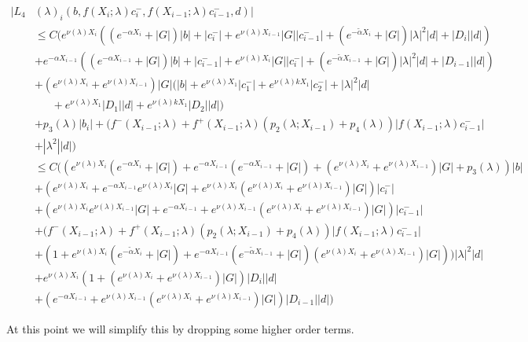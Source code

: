 \documentclass[12pt]{article}
\begin{document}
\begin{enumerate}
\begin{align*}
|L_4&(\lambda)_i(b, f(X_i; \lambda) c_i^-, f(X_{i-1}; \lambda) c_{i-1}^-, d)|\\ 
&\leq C\Big( e^{\nu(\lambda)X_{i}} ((e^{-\alpha X_i} + |G|) |b| 
+ |c_i^-| + e^{\nu(\lambda)X_{i-1}} |G||c_{i-1}^-| + (e^{-\tilde{\alpha} X_i} + |G|) |\lambda|^2 |d| + |D_i||d|)\\
&+  e^{-\alpha X_{i-1}} ((e^{-\alpha X_{i-1}} + |G|) |b| 
+ |c_{i-1}^-| + e^{\nu(\lambda)X_i} |G||c_i^-| + (e^{-\tilde{\alpha} X_{i-1}} + |G|) |\lambda|^2 |d| + |D_{i-1}||d|) \\
&+ (e^{\nu(\lambda)X_i} + e^{\nu(\lambda)X_{i-1}}) |G| ( |b| + e^{\nu(\lambda) X_1} |c_1^-| +  e^{\nu(\lambda) k X_1} |c_2^-| + |\lambda|^2 |d| \\
&\:\:\:\:\:\:\:+ e^{\nu(\lambda) X_1} |D_1| |d| + e^{\nu(\lambda) k X_1} |D_2| |d| ) \\
&+ p_3(\lambda) |b_i| + (f^-(X_{i-1}; \lambda) + f^+(X_{i-1}; \lambda) (p_2(\lambda; X_{i-1}) + p_4(\lambda)) | f(X_{i-1}; \lambda) c_{i-1}^-| \\
&+|\lambda^2| |d|) \\
&\leq C\Big( 
(e^{\nu(\lambda)X_{i}} (e^{-\alpha X_i} + |G|) + e^{-\alpha X_{i-1}} (e^{-\alpha X_{i-1}} + |G|) + (e^{\nu(\lambda)X_i} + e^{\nu(\lambda)X_{i-1}}) |G| + p_3(\lambda)) |b| \\
&+ (e^{\nu(\lambda)X_i} + e^{-\alpha X_{i-1}} e^{\nu(\lambda)X_i} |G|
+ e^{\nu(\lambda)X_i} (e^{\nu(\lambda)X_i} + e^{\nu(\lambda)X_{i-1}}) |G|)|c_i^-| \\
&+ (e^{\nu(\lambda)X_i} e^{\nu(\lambda)X_{i-1}} |G| +  e^{-\alpha X_{i-1}} 
+ e^{\nu(\lambda)X_{i-1}} (e^{\nu(\lambda)X_i} + e^{\nu(\lambda)X_{i-1}}) |G|) |c_{i-1}^-| \\
&+ (f^-(X_{i-1}; \lambda) + f^+(X_{i-1}; \lambda) (p_2(\lambda; X_{i-1}) + p_4(\lambda)) | f(X_{i-1}; \lambda) c_{i-1}^-| \\
&+ (1 + e^{\nu(\lambda)X_i}(e^{-\tilde{\alpha} X_i} + |G|) 
+ e^{-\alpha X_{i-1}} (e^{-\tilde{\alpha} X_{i-1}} + |G|) 
(e^{\nu(\lambda)X_i} + e^{\nu(\lambda)X_{i-1}}) |G|) )|\lambda|^2 |d| \\ 
&+ e^{\nu(\lambda)X_i}(1 + (e^{\nu(\lambda)X_i} + e^{\nu(\lambda)X_{i-1}}) |G|) |D_i||d| \\
&+ (e^{-\alpha X_{i-1}} + e^{\nu(\lambda)X_{i-1}} (e^{\nu(\lambda)X_i} + e^{\nu(\lambda)X_{i-1}}) |G|) |D_{i-1}||d| \Big)
\end{align*}

At this point we will simplify this by dropping some higher order terms.


\end{enumerate}
\end{document}
